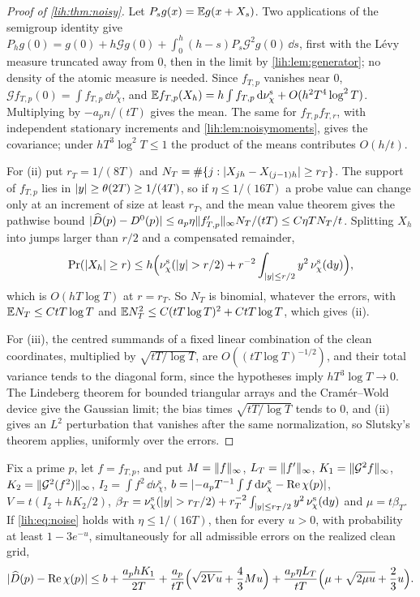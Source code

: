 \begin{proof}[Proof of \cref{lih:thm:noisy}]
Let $P_sg(x)=\mathbb{E} g(x+X_s)$. Two applications of the semigroup identity give
$P_hg(0)=g(0)+h\mathcal Gg(0)+\int_0^h(h-s)P_s\mathcal G^2g(0)\,\dd s$, first with the L\'evy measure truncated away from $0$,
then in the limit by \cref{lih:lem:generator}; no density of the atomic measure is needed. Since
$f_{T,p}$ vanishes near $0$, $\mathcal Gf_{T,p}(0)=\int f_{T,p}\,\dd\nu^{\mathrm s}_\chi$, and
$\mathbb{E} f_{T,p}(X_h)=h\int f_{T,p}\,\mathrm{d}\nu^{\mathrm s}_\chi+O(h^2T^4\log^2T)$. Multiplying by $-a_pn/(tT)$ gives the mean. The
same for $f_{T,p}f_{T,r}$, with independent stationary increments and \cref{lih:lem:noisymoments}, gives
the covariance; under $hT^3\log^2T\le1$ the product of the means contributes $O(h/t)$.

For (ii) put $r_T=1/(8T)$ and $N_T=\#\{j:\lvert X_{jh}-X_{(j-1)h}\rvert\ge r_T\}$. The support of $f_{T,p}$ lies in
$\lvert y\rvert\ge\theta(2T)\ge1/(4T)$, so if $\eta\le1/(16T)$ a probe value can change only at an increment of size at least
$r_T$, and the mean value theorem gives the pathwise bound
$\lvert\widehat D(p)-D^0(p)\rvert\le a_p\eta\lVert f_{T,p}'\rVert_\infty N_T/(tT)\le C\eta TN_T/t$. Splitting $X_h$ into jumps larger than $r/2$
and a compensated remainder,
\[
 \Pr(\lvert X_h\rvert\ge r)\le h\Bigl(\nu^{\mathrm s}_\chi(\lvert y\rvert>r/2)+r^{-2}\int_{\lvert y\rvert\le r/2}y^2\,\nu^{\mathrm s}_\chi(\mathrm{d} y)\Bigr),
\]
which is $O(hT\log T)$ at $r=r_T$. So $N_T$ is binomial, whatever the errors, with
$\mathbb{E} N_T\le CtT\log T$ and $\mathbb{E} N_T^2\le C(tT\log T)^2+CtT\log T$, which gives (ii).

For (iii), the centred summands of a fixed linear combination of the clean coordinates, multiplied by
$\sqrt{tT/\log T}$, are $O((tT\log T)^{-1/2})$, and their total variance tends to the diagonal form, since the
hypotheses imply $hT^3\log T\to0$. The Lindeberg theorem for bounded triangular arrays and the
Cram\'er--Wold device give the Gaussian limit; the bias times $\sqrt{tT/\log T}$ tends to $0$, and (ii) gives an
$L^2$ perturbation that vanishes after the same normalization, so Slutsky's theorem applies, uniformly
over the errors.
\end{proof}

\begin{proposition}\label{lih:prop:noisyconf}
Fix a prime $p$, let $f=f_{T,p}$, and put $M=\lVert f\rVert_\infty$, $L_T=\lVert f'\rVert_\infty$, $K_1=\lVert\mathcal G^2f\rVert_\infty$,
$K_2=\lVert\mathcal G^2(f^2)\rVert_\infty$, $I_2=\int f^2\,\dd\nu^{\mathrm s}_\chi$, $b=\lvert-a_pT^{-1}\int f\,\mathrm{d}\nu^{\mathrm s}_\chi-\operatorname{Re}\chi(p)\rvert$,
$V=t(I_2+hK_2/2)$, $\beta_T=\nu^{\mathrm s}_\chi(\lvert y\rvert>r_T/2)+r_T^{-2}\int_{\lvert y\rvert\le r_T/2}y^2\,\nu^{\mathrm s}_\chi(\mathrm{d} y)$ and $\mu=t\beta_T$. If
\eqref{lih:eq:noise} holds with $\eta\le1/(16T)$, then for every $u>0$, with probability at least $1-3e^{-u}$,
simultaneously for all admissible errors on the realized clean grid,
\[
 \lvert\widehat D(p)-\operatorname{Re}\chi(p)\rvert\le b+\frac{a_phK_1}{2T}+\frac{a_p}{tT}\Bigl(\sqrt{2Vu}+\frac43Mu\Bigr)
 +\frac{a_p\eta L_T}{tT}\Bigl(\mu+\sqrt{2\mu u}+\frac23u\Bigr).
\]
\end{proposition}

